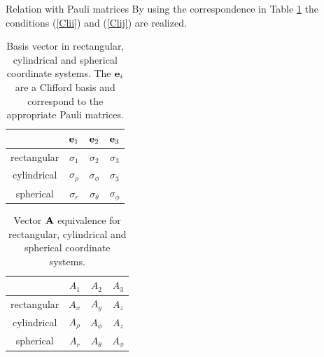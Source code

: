 \documentclass[handout,10pt]{beamer}
\begin{document}
%
\begin{frame}[shrink=00]{Relation with Pauli matrices}
By using the  correspondence in Table \ref{sigmai_table2} the conditions (\ref{Clii}) and (\ref{Clij}) are realized.
\begin{table}[]
\centering
\caption{Basis vector in rectangular, cylindrical and spherical coordinate systems. The $\mathbf{e}_i$ are a Clifford basis and correspond to the appropriate Pauli matrices.}
\label{sigmai_table2}
\begin{tabular}{| c | c | c | c | }
\hline
 & $\mathbf{e}_1$ & $\mathbf{e}_2$  & $\mathbf{e}_3$  \\
\hline
rectangular & $\sigma_1$ & $\sigma_2$  &  $\sigma_3$ \\ \hline
cylindrical & $\sigma_\rho$ & $\sigma_\phi$  &  $\sigma_3$    \\ \hline
spherical & $\sigma_r$ & $\sigma_\theta$  &  $\sigma_\phi$   \\ \hline
\end{tabular}
\end{table}

\begin{table}[]
\centering
\caption{Vector $\mathbf{A}$ equivalence for rectangular, cylindrical and spherical coordinate systems. }
\label{Avect_table}
\begin{tabular}{| c | c | c | c | }
\hline
 & $A_1$ & $A_2$  & $A_3$  \\
\hline
rectangular & $A_x$ & $A_y$  & $A_z$ \\ \hline
cylindrical &$A_\rho$ & $A_\phi$  & $A_z$    \\ \hline
spherical & $A_r$ & $A_\theta$  & $A_\phi$   \\ \hline
\end{tabular}
\end{table}
\end{frame}
%
\end{document}
